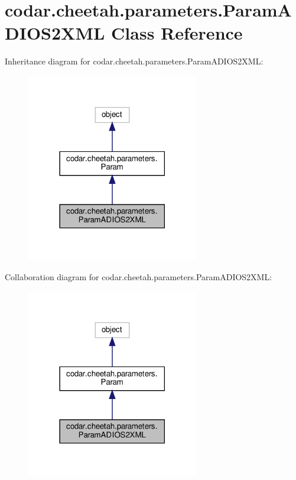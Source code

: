 \hypertarget{classcodar_1_1cheetah_1_1parameters_1_1_param_a_d_i_o_s2_x_m_l}{}\section{codar.\+cheetah.\+parameters.\+Param\+A\+D\+I\+O\+S2\+X\+ML Class Reference}
\label{classcodar_1_1cheetah_1_1parameters_1_1_param_a_d_i_o_s2_x_m_l}


Inheritance diagram for codar.\+cheetah.\+parameters.\+Param\+A\+D\+I\+O\+S2\+X\+ML\+:
\nopagebreak
\begin{figure}[H]
\begin{center}
\leavevmode
\includegraphics[width=213pt]{classcodar_1_1cheetah_1_1parameters_1_1_param_a_d_i_o_s2_x_m_l__inherit__graph}
\end{center}
\end{figure}


Collaboration diagram for codar.\+cheetah.\+parameters.\+Param\+A\+D\+I\+O\+S2\+X\+ML\+:
\nopagebreak
\begin{figure}[H]
\begin{center}
\leavevmode
\includegraphics[width=213pt]{classcodar_1_1cheetah_1_1parameters_1_1_param_a_d_i_o_s2_x_m_l__coll__graph}
\end{center}
\end{figure}
